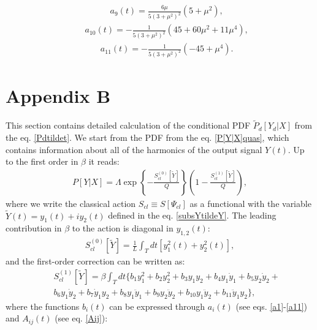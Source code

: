 \documentclass{article}
\begin{document}
\begin{eqnarray}\label{a9}
    &&a_{9}(t) = \frac{6\mu}{5(3+\mu^{2})^{2}} (5+\mu^{2}),
\end{eqnarray}
\begin{eqnarray}\label{a10}
    &&a_{10}(t) = -\frac{1}{5(3+\mu^{2})^{2}} (45 + 60\mu^{2} + 11\mu^{4}),
\end{eqnarray}
\begin{eqnarray}\label{a11}
    &&a_{11}(t) = -\frac{1}{5(3+\mu^{2})^{2}} (-45 + \mu^{4}).
\end{eqnarray}











\section{Appendix B}
This section contains detailed calculation of the conditional PDF $\tilde{P}_{d}[Y_{d}|X]$ from the eq. \eqref{Pdtildet}. We start from the PDF from the eq. \eqref{P[Y|X]quas}, which contains information about all of the harmonics of the output signal $Y(t)$. Up to the first order in $\beta$ it reads: 
\begin{eqnarray}\label{BP[Y|X]initial}
    P[Y|X] = \Lambda \exp \left\{-\frac{S_{cl}^{(0)}[\tilde{Y}]}{Q}\right\}\left(1-\frac{S_{cl}^{(1)}[\tilde{Y}]}{Q}\right),
\end{eqnarray}
where we write the classical action $S_{cl} \equiv S[\Psi_{cl}]$ as a functional with the variable $\tilde{Y}(t) = y_{1}(t)+iy_{2}(t)$ defined in the eq. \eqref{subsYtildeY}. The leading contribution in $\beta$ to the action is diagonal in $y_{1,2}(t)$:
\begin{eqnarray}
    S_{cl}^{(0)}[\tilde{Y}] = \frac{1}{L}\int_{T}dt\left[y_{1}^{2}(t)+y_{2}^{2}(t)\right],
\end{eqnarray}
and the first-order correction can be written as: 
\begin{eqnarray}
    &&S_{cl}^{(1)}[\tilde{Y}] = \beta \int_{T} dt \{b_{1}y_{1}^{2} + b_{2}y_{2}^{2} + b_{3}y_{1}y_{2} + b_{4}y_{1}\dot{y}_{1} + b_{5}y_{2}\dot{y}_{2} + \nonumber\\
    &&b_{6}y_{1}\dot{y}_{2} + b_{7}\dot{y}_{1}y_{2} + b_{8}y_{1}\ddot{y}_{1} + b_{9}y_{2}\ddot{y}_{2} + b_{10}y_{1}\ddot{y}_{2} + b_{11}\ddot{y}_{1}y_{2}\},
\end{eqnarray}
where the functions $b_{i}(t)$ can be expressed through $a_{i}(t)$ (see eqs. \eqref{a1}-\eqref{a11}) and $A_{ij}(t)$ (see eq. \eqref{Aij}):
\end{document}
